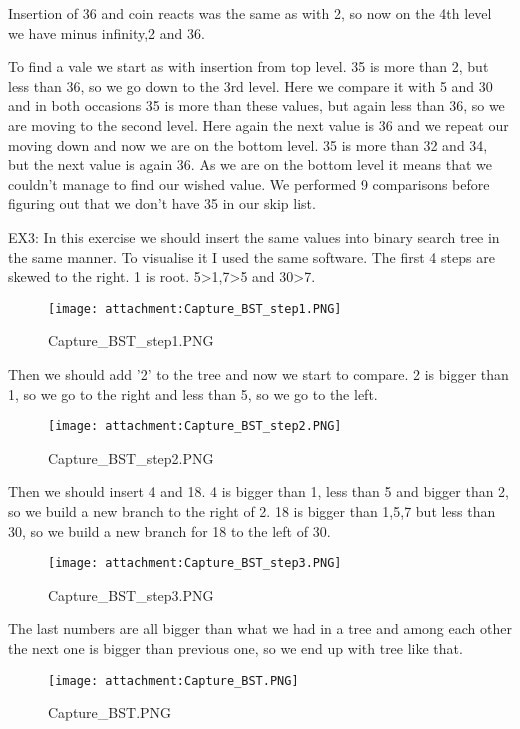 \documentclass[11pt]{article}
\makeatletter
\def\maxwidth{\ifdim\Gin@nat@width>\linewidth\linewidth
    \else\Gin@nat@width\fi}
\let\Oldincludegraphics\includegraphics
\renewcommand{\includegraphics}[1]{\Oldincludegraphics[width=.8\maxwidth]{#1}}
\makeatother
\begin{document}
    Insertion of 36 and coin reacts was the same as with 2, so now on the
4th level we have minus infinity,2 and 36.

    To find a vale we start as with insertion from top level. 35 is more
than 2, but less than 36, so we go down to the 3rd level. Here we
compare it with 5 and 30 and in both occasions 35 is more than these
values, but again less than 36, so we are moving to the second level.
Here again the next value is 36 and we repeat our moving down and now we
are on the bottom level. 35 is more than 32 and 34, but the next value
is again 36. As we are on the bottom level it means that we couldn't
manage to find our wished value. We performed 9 comparisons before
figuring out that we don't have 35 in our skip list.

    EX3: In this exercise we should insert the same values into binary
search tree in the same manner. To visualise it I used the same
software. The first 4 steps are skewed to the right. 1 is root.
5\textgreater{}1,7\textgreater{}5 and 30\textgreater{}7.

    \begin{figure}
\centering
\texttt{[image: attachment:Capture\_BST\_step1.PNG]}
\caption{Capture\_BST\_step1.PNG}
\end{figure}

    Then we should add '2' to the tree and now we start to compare. 2 is
bigger than 1, so we go to the right and less than 5, so we go to the
left.

    \begin{figure}
\centering
\texttt{[image: attachment:Capture\_BST\_step2.PNG]}
\caption{Capture\_BST\_step2.PNG}
\end{figure}

    Then we should insert 4 and 18. 4 is bigger than 1, less than 5 and
bigger than 2, so we build a new branch to the right of 2. 18 is bigger
than 1,5,7 but less than 30, so we build a new branch for 18 to the left
of 30.

    \begin{figure}
\centering
\texttt{[image: attachment:Capture\_BST\_step3.PNG]}
\caption{Capture\_BST\_step3.PNG}
\end{figure}

    The last numbers are all bigger than what we had in a tree and among
each other the next one is bigger than previous one, so we end up with
tree like that.

    \begin{figure}
\centering
\texttt{[image: attachment:Capture\_BST.PNG]}
\caption{Capture\_BST.PNG}
\end{figure}
\end{document}
